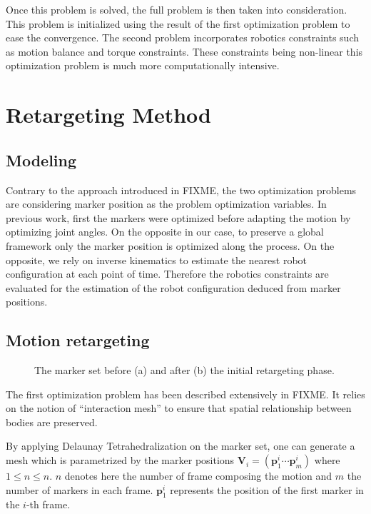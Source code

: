 \documentclass[letterpaper, 10 pt, conference]{ieeeconf}  %
\begin{document}
Once this problem is solved, the full problem is then taken into
consideration. This problem is initialized using the result of the
first optimization problem to ease the convergence. The second problem
incorporates robotics constraints such as motion balance and torque
constraints. These constraints being non-linear this optimization
problem is much more computationally intensive.



\section{Retargeting Method}
\label{sec:retargeting}

\subsection{Modeling}

Contrary to the approach introduced in FIXME, the two optimization
problems are considering marker position as the problem optimization
variables. In previous work, first the markers were optimized before
adapting the motion by optimizing joint angles. On the opposite in our
case, to preserve a global framework only the marker position is
optimized along the process. On the opposite, we rely on inverse
kinematics to estimate the nearest robot configuration at each point
of time. Therefore the robotics constraints are evaluated for the
estimation of the robot configuration deduced from marker positions.


\subsection{Motion retargeting}


\begin{figure}[htbp!]
  \label{fig:retargeting}
  \caption{The marker set before (a) and after (b) the initial
    retargeting phase.}
\end{figure}


The first optimization problem has been described extensively in
FIXME. It relies on the notion of ``interaction mesh'' to ensure that
spatial relationship between bodies are preserved.

By applying Delaunay Tetrahedralization \cite{FIXME} on the marker
set, one can generate a mesh which is parametrized by the marker
positions $\mathbf{V}_i = (\mathbf{p}^i_1 \cdots \mathbf{p}^i_m)$
where $1 \leq n \leq n$. $n$ denotes here the number of frame
composing the motion and $m$ the number of markers in each
frame. $\mathbf{p}^i_1$ represents the position of the first marker in
the $i$-th frame.
\end{document}
